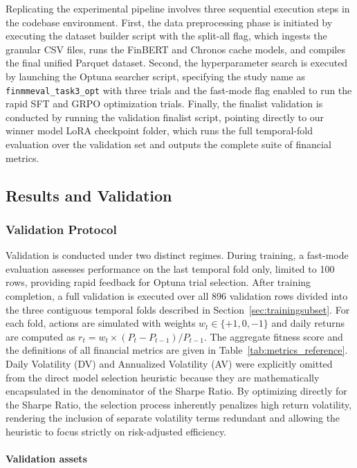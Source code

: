     
    Replicating the experimental pipeline involves three sequential execution steps in the codebase environment. First, the data preprocessing phase is initiated by executing the dataset builder script with the split-all flag, which ingests the granular CSV files, runs the FinBERT and Chronos cache models, and compiles the final unified Parquet dataset. Second, the hyperparameter search is executed by launching the Optuna searcher script, specifying the study name as \texttt{finmmeval\_task3\_opt} with three trials and the fast-mode flag enabled to run the rapid SFT and GRPO optimization trials. Finally, the finalist validation is conducted by running the validation finalist script, pointing directly to our winner model LoRA checkpoint folder, which runs the full temporal-fold evaluation over the validation set and outputs the complete suite of financial metrics.
    
    \subsection{Results and Validation}

    \subsubsection{Validation Protocol}

    Validation is conducted under two distinct regimes. During training, a fast-mode evaluation assesses performance on the last temporal fold only, limited to 100 rows, providing rapid feedback for Optuna trial selection. After training completion, a full validation is executed over all 896 validation rows divided into the three contiguous temporal folds described in Section~\ref{sec:trainingsubset}. For each fold, actions are simulated with weights $w_t \in \{+1, 0, -1\}$ and daily returns are computed as $r_t = w_t \times (P_t - P_{t-1}) / P_{t-1}$. The aggregate fitness score and the definitions of all financial metrics are given in Table~\ref{tab:metrics_reference}. Daily Volatility (DV) and Annualized Volatility (AV) were explicitly omitted from the direct model selection heuristic because they are mathematically encapsulated in the denominator of the Sharpe Ratio. By optimizing directly for the Sharpe Ratio, the selection process inherently penalizes high return volatility, rendering the inclusion of separate volatility terms redundant and allowing the heuristic to focus strictly on risk-adjusted efficiency.

    \paragraph{Validation assets}


